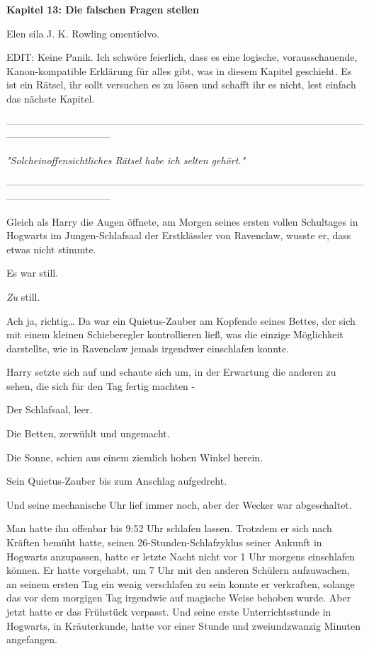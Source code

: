 

\hypertarget{die-falschen-fragen-stellen}{%

\textbf{Kapitel 13: Die falschen Fragen stellen\\ }

Elen sila J. K. Rowling omentielvo.

EDIT: Keine Panik. Ich schwöre feierlich, dass es eine logische, vorausschauende, Kanon-kompatible Erklärung für alles gibt, was in diesem Kapitel geschieht. Es ist ein Rätsel, ihr sollt versuchen es zu lösen und schafft ihr es nicht, lest einfach das nächste Kapitel.

--------------------------------------------------------------------------------------------------------------------------------------------

\emph{\emph{"}\emph{Solch}\emph{ein}\emph{offensichtlich}\emph{es Rätsel habe ich selten gehört."}}

--------------------------------------------------------------------------------------------------------------------------------------------

Gleich als Harry die Augen öffnete, am Morgen seines ersten vollen Schultages in Hogwarts im Jungen-Schlafsaal der Erstklässler von Ravenclaw, wusste er, dass etwas nicht stimmte.

Es war still.

\emph{Zu} still.

Ach ja, richtig… Da war ein Quietus-Zauber am Kopfende seines Bettes, der sich mit einem kleinen Schieberegler kontrollieren ließ, was die einzige Möglichkeit darstellte, wie in Ravenclaw jemals irgendwer einschlafen konnte.

Harry setzte sich auf und schaute sich um, in der Erwartung die anderen zu sehen, die sich für den Tag fertig machten -

Der Schlafsaal, leer.

Die Betten, zerwühlt und ungemacht.

Die Sonne, schien aus einem ziemlich hohen Winkel herein.

Sein Quietus-Zauber bis zum Anschlag aufgedreht.

Und seine mechanische Uhr lief immer noch, aber der Wecker war abgeschaltet.

Man hatte ihn offenbar bis 9:52 Uhr schlafen lassen. Trotzdem er sich nach Kräften bemüht hatte, seinen 26-Stunden-Schlafzyklus seiner Ankunft in Hogwarts anzupassen, hatte er letzte Nacht nicht vor 1 Uhr morgens einschlafen können. Er hatte vorgehabt, um 7 Uhr mit den anderen Schülern aufzuwachen, an seinem ersten Tag ein wenig verschlafen zu sein konnte er verkraften, solange das vor dem morgigen Tag irgendwie auf magische Weise behoben wurde. Aber jetzt hatte er das Frühstück verpasst. Und seine erste Unterrichtsstunde in Hogwarts, in Kräuterkunde, hatte vor einer Stunde und zweiundzwanzig Minuten angefangen.

}
